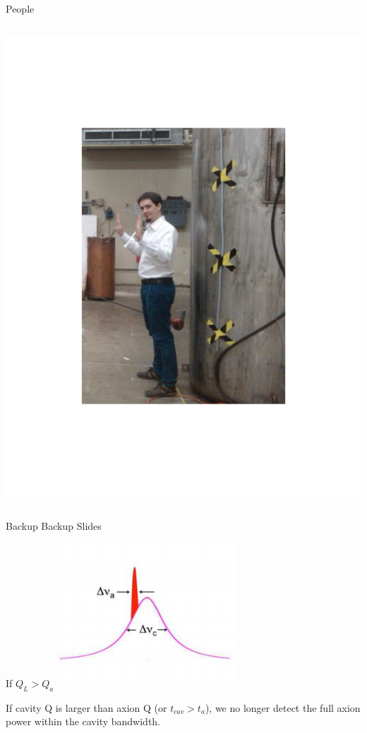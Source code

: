 \documentclass{beamer}
\begin{document}
\begin{frame}{People}
\begin{columns}
\includegraphics[width=\textwidth]{gray_pic}

\end{columns}

\end{frame}






\begin{frame}{Backup}
\centering
Backup Slides
\end{frame}

\begin{frame}{If $Q_L > Q_a$}
\includegraphics[width=0.5\textwidth]{axion_bw}

If cavity Q is larger than axion Q (or $t_{cav} > t_a$), we no longer detect the full axion power within the cavity bandwidth.
\end{frame}
\end{document}
